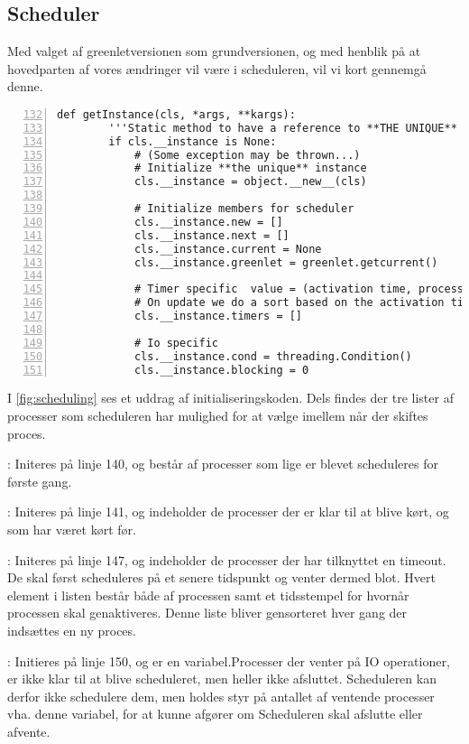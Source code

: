 \subsection{Scheduler}
Med valget af greenletversionen som grundversionen, og med henblik på at hovedparten af vores ændringer vil være i scheduleren, vil vi kort gennemgå denne.

\begin{lstlisting}[firstnumber=132,stepnumber=5,numbers=left, float, label=fig:scheduling, caption=Uddrag af Scheduler.py i greenletsversionen.]
    def getInstance(cls, *args, **kargs):
        '''Static method to have a reference to **THE UNIQUE** instance'''
        if cls.__instance is None:
            # (Some exception may be thrown...)
            # Initialize **the unique** instance
            cls.__instance = object.__new__(cls)

            # Initialize members for scheduler
            cls.__instance.new = []
            cls.__instance.next = []
            cls.__instance.current = None
            cls.__instance.greenlet = greenlet.getcurrent()

            # Timer specific  value = (activation time, process)
            # On update we do a sort based on the activation time
            cls.__instance.timers = []

            # Io specific
            cls.__instance.cond = threading.Condition()
            cls.__instance.blocking = 0
\end{lstlisting}

 I \cref{fig:scheduling} ses et uddrag af initialiseringskoden. Dels findes der tre lister af processer som scheduleren har mulighed for at vælge imellem når der skiftes proces.  
 \begin{list}
 \tightlist 
 \item {}: Initeres på linje 140, og består af processer som lige er blevet scheduleres for første gang.
 \item {}: Initeres på linje 141, og indeholder de processer der er klar til at blive kørt, og som har været kørt før.  
 \item {}: Initeres på linje 147, og indeholder de processer der har tilknyttet en timeout. De skal først scheduleres på et senere tidspunkt og venter dermed blot. Hvert element i listen består både af processen samt et tidsstempel for hvornår processen skal genaktiveres. Denne liste bliver gensorteret hver gang der indsættes en ny proces.
 \item {}: Initieres på linje 150, og er en variabel.Processer der venter på IO operationer, er ikke klar til at blive scheduleret, men heller ikke afsluttet. Scheduleren kan derfor ikke schedulere dem, men holdes styr på antallet af ventende processer vha. denne variabel, for at kunne afgører om Scheduleren skal afslutte eller afvente.
\end{list}

